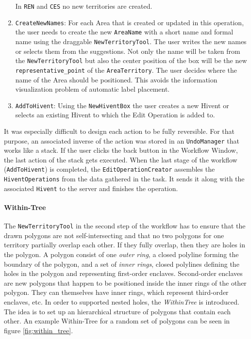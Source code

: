 \begin{enumerate}
\begin{itemize}
  \end{itemize}
  In \texttt{REN} and \texttt{CES} no new territories are created.
  \item \texttt{CreateNewNames}: For each Area that is created or updated in this operation, the user needs to create the new \texttt{AreaName} with a short name and formal name using the draggable \texttt{NewTerritoryTool}. The user writes the new names or selects them from the suggestions. Not only the name will be taken from the \texttt{NewTerritoryTool} but also the center position of the box will be the new \texttt{representative\_point} of the \texttt{AreaTerritory}. The user decides where the name of the Area should be positioned. This avoids the information visualization problem of automatic label placement.
  \item \texttt{AddToHivent}: Using the \texttt{NewHiventBox} the user creates a new Hivent or selects an existing Hivent to which the Edit Operation is added to.
\end{enumerate}

It was especially difficult to design each action to be fully reversible. For that purpose, an associated inverse of the action was stored in an \texttt{UndoManager} that works like a stack. If the user clicks the back button in the Workflow Window, the last action of the stack gets executed. When the last stage of the workflow (\texttt{AddToHivent}) is completed, the \texttt{EditOperationCreator} assembles the \texttt{HiventOperations} from the data gathered in the task. It sends it along with the associated \texttt{Hivent} to the server and finishes the operation.



\paragraph{Within-Tree} %
\label{par:within_tree}

The \texttt{NewTerritoryTool} in the second step of the workflow has to ensure that the drawn polygons are not self-intersecting and that no two polygons for one territory partially overlap each other. If they fully overlap, then they are holes in the polygon. A polygon consist of one \emph{outer ring}, a closed polyline forming the boundary of the polygon, and a set of \emph{inner rings}, closed polylines defining the holes in the polygon and representing first-order enclaves. Second-order enclaves are new polygons that happen to be positioned inside the inner rings of the other polygon. They can themselves have inner rings, which represent third-order enclaves, etc. In order to supported nested holes, the \emph{WithinTree} is introduced. The idea is to set up an hierarchical structure of polygons that contain each other. An example Within-Tree for a random set of polygons can be seen in figure \ref{fig:within_tree}.

